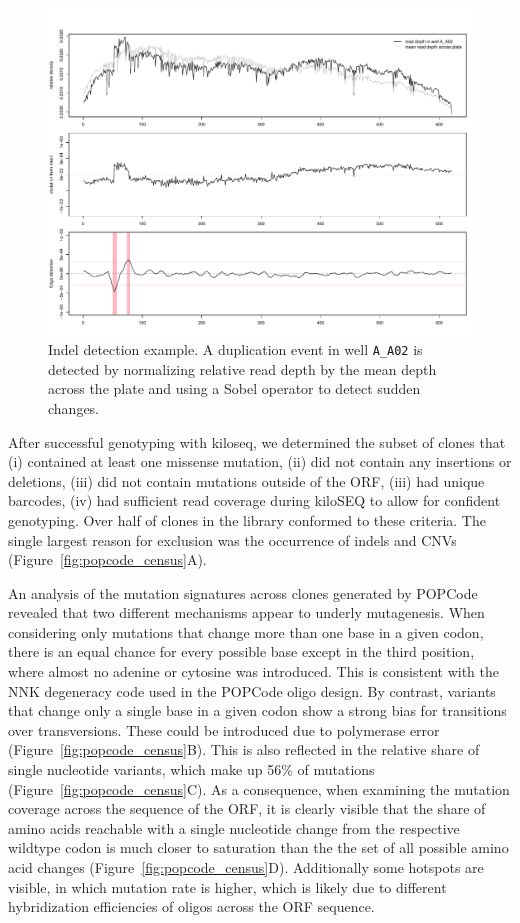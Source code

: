 \begin{figure}[h!]
	\centering
	\includegraphics[width=\textwidth]{img/border_detect.pdf}
	\caption{Indel detection example. A duplication event in well \texttt{A\_A02} is detected by normalizing relative read depth by the mean depth across the plate and using a Sobel operator to detect sudden changes.}
	\label{fig:border_detect}
\end{figure}


After successful genotyping with kiloseq, we determined the subset of clones that (i) contained at least one missense mutation, (ii) did not contain any insertions or deletions, (iii) did not contain mutations outside of the ORF, (iii) had unique barcodes, (iv) had sufficient read coverage during kiloSEQ to allow for confident genotyping.
Over half of clones in the library conformed to these criteria. The single largest reason for exclusion was the occurrence of indels and CNVs (Figure~\ref{fig:popcode_census}A). 

An analysis of the mutation signatures across clones generated by POPCode revealed that two different mechanisms appear to underly mutagenesis. When considering only mutations that change more than one base in a given codon, there is an equal chance for every possible base except in the third position, where almost no adenine or cytosine was introduced. This is consistent with the NNK degeneracy code used in the POPCode oligo design. By contrast, variants that change only a single base in a given codon show a strong bias for transitions over transversions. These could be introduced due to polymerase error (Figure~\ref{fig:popcode_census}B). This is also reflected in the relative share of single nucleotide variants, which make up 56\% of mutations (Figure~\ref{fig:popcode_census}C). As a consequence, when examining the mutation coverage across the sequence of the ORF, it is clearly visible that the share of amino acids reachable with a single nucleotide change from the respective wildtype codon is much closer to saturation than the the set of all possible amino acid changes (Figure~\ref{fig:popcode_census}D). Additionally some hotspots are visible, in which mutation rate is higher, which is likely due to different hybridization efficiencies of oligos across the ORF sequence.

